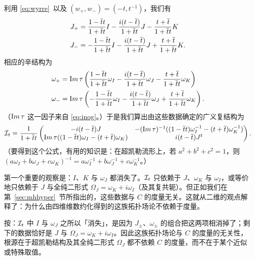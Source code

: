 利用 \eqref{eq:wyrre}\ 以及 $(w_+,w_-)=(-t,t^{-1})$，我们有 %
\setcounter{equation}{27}
\begin{equation}\label{eq:ytro}
\begin{aligned} J_+ & = {1-\bar t t\over 1+\bar t t}I-{i(t-\bar t)\over
1+\bar t t}J-{t+\bar t\over 1+\bar t t}K  \\ J_- & = -{1-\bar
tt\over 1+\bar t t}I-{i(t-\bar t)\over 1+\bar t t}J+{t+\bar t\over
1+\bar t t}K  .\\\end{aligned}
\end{equation}
相应的辛结构为
\setcounter{equation}{28}
\begin{equation}\label{eq:bytro}
\begin{aligned} \omega_+ &={\rm Im}\,\tau\left( {1-\bar t t\over 1+\bar
t t}\omega_I-{i(t-\bar t)\over 1+\bar t t}\omega_J-{t+\bar t\over
1+\bar t t}\omega_K\right) \\ \omega_- & = {\rm
Im}\,\tau\left(-{1-\bar tt\over 1+\bar t t}\omega_I-{i(t-\bar
t)\over 1+\bar t t}\omega_J+{t+\bar t\over 1+\bar t
t}\omega_K\right) .\\\end{aligned}
\end{equation}
（${\rm Im}\,\tau$ 这一因子来自 \eqref{eq:inog}。）于是我们算出由这些数据确定的广义复结构为 %
\setcounter{equation}{29}
\begin{equation}\label{eq:islo}
{\cal I}_t={1\over
1+\bar t t}\left(\begin{matrix}-i(t-\bar t)J & -({\rm
Im}\,\tau)^{-1}((1-\bar t t)\omega_I^{-1}-(t+\bar
t)\omega_K^{-1})\\ {\rm Im}\,\tau ((1-\bar t t)\omega_I-(t+\bar
t)\omega_K)& i(t-\bar t)J^t\\\end{matrix}\right).
\end{equation}
（要得到这个公式，有用的知识是：在超凯勒流形上，若 $a^2+b^2+c^2=1$，则 $(a\omega_I+b\omega_J+c\omega_K)^{-1}=a\omega_I^{-1}+b\omega_J^{-1}+c\omega_K^{-1}$。）

第一个重要的观察是：$I$、$K$ 与 $\omega_J$ 都消失了。${\cal I}_t$ 只依赖于 $J$、$\omega_K$ 与 $\omega_I$，或等价地只依赖于 $J$ 与全纯二形式 $\Omega_J=\omega_K+i\omega_I$（及其复共轭）。但正如我们在第~\ref{sec:mhhyper}~节所指出的，这些数据与 $C$ 的度量无关。这就从二维的观点解释了：为什么由四维维数约化得到的这族拓扑场论不依赖于度量。

\begin{yizhu}[易错点]
按：${\cal I}_t$ 中 $I$ 与 $\omega_J$ 之所以「消失」，是因为 $J_\pm$、$\omega_\pm$ 的组合把这两项相消掉了；剩下的数据恰好是 $J$ 与 $\Omega_J=\omega_K+i\omega_I$。因此这族拓扑场论与 $C$ 的度量的无关性，根源在于超凯勒结构及其全纯二形式 $\Omega_J$ 都不依赖 $C$ 的度量，而不在于某个近似或特殊取值。
\end{yizhu}

